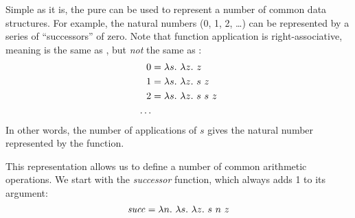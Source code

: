 \documentclass[12pt]{report}
\begin{document}


Simple as it is, the pure \lamA can be used to represent a number of
common data structures. For example, the natural numbers (0, 1, 2,
\ldots) can be represented by a series of ``successors'' of zero. Note
that function application is right-associative, meaning
 is the same as ,
but \emph{not} the same as :
\begin{equation*}
  \begin{split}
    0 &= \lambda s.\ \lambda z.\ z \\
    1 &= \lambda s.\ \lambda z.\ s\ z \\
    2 &= \lambda s.\ \lambda z.\ s\ s\ z \\
    \ldots
  \end{split}
\end{equation*}
In other words, the number of applications of $s$ gives the natural
number represented by the function. 

This representation allows
us to define a number of common arithmetic operations. We start 
with the \emph{successor} function, which always adds 1 to its
argument:
\begin{equation}
  \mathit{succ} = \lambda n.\ \lambda s.\ \lambda z.\ s\ n\ z
\end{equation}




\end{document}
